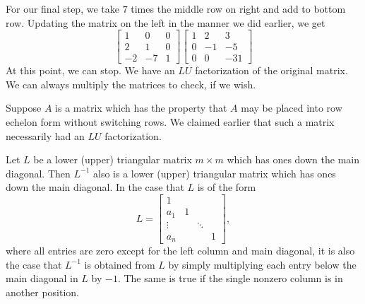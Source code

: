 \documentclass{ximera}
\begin{document}
\begin{example}
\begin{explanation}
For our final step, we take $7$ times the middle row on right and add to bottom row. Updating the matrix on the left in the manner we did earlier, we get
\[
\begin{bmatrix}
1 & 0 & 0 \\
2 & 1 & 0 \\
-2 & -7 & 1
\end{bmatrix} 
\begin{bmatrix}
1 & 2 & 3 \\
0 & -1 & -5 \\
0 & 0 & -31
\end{bmatrix} 
\]
At this point, we can stop. We have an $LU$ factorization of the original matrix.  We can always multiply the matrices to check, if we wish.
\end{explanation}
\end{example}

Suppose $A$ is a matrix which has the property that $A$ may be placed into row echelon form without switching rows.  We claimed earlier that such a matrix necessarily had an $LU$ factorization.  



\begin{lemma}\label{lem:multipliermethodtriangularmatrices}
Let $L$ be a lower (upper) triangular matrix $m\times m$
which has ones down the main diagonal. Then $L^{-1}$ also is a lower (upper)
triangular matrix which has ones down the main diagonal. In the case that $L$
is of the form
\begin{equation}\label{4nove1h}
L=
\begin{bmatrix}
1 &  &  &  \\
a_{1} & 1 &  &  \\
\vdots &  & \ddots &  \\
a_{n} &  &  & 1
\end{bmatrix}, 
\end{equation}
where all entries are zero except for the left column and main diagonal, it
is also the case that $L^{-1}$ is obtained from $L$ by simply multiplying each entry below the main diagonal in $L$ by $-1$. The same is true if the single nonzero column is in another position.
\end{lemma}
\end{document}
